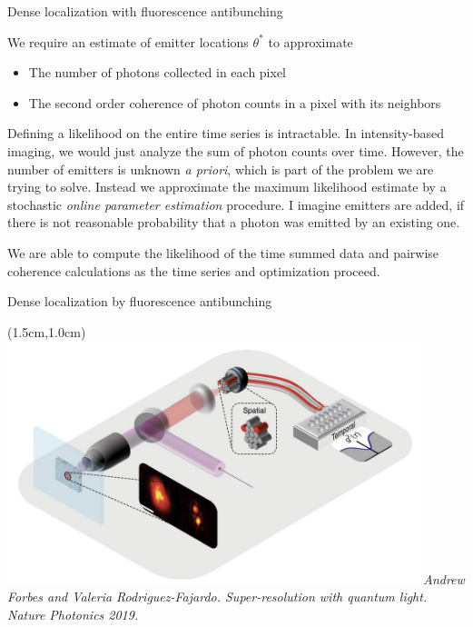 \documentclass{beamer}					%
\begin{document}
\begin{frame}{Dense localization with fluorescence antibunching}

We require an estimate of emitter locations $\theta^{*}$ to approximate 

\begin{itemize}
\item The number of photons collected in each pixel \\
\item The second order coherence of photon counts in a pixel with its neighbors 
\end{itemize}

Defining a likelihood on the entire time series is intractable. In intensity-based imaging, we would just analyze the sum of photon counts over time. However, the number of emitters is unknown \emph{a priori}, which is part of the problem we are trying to solve. Instead we approximate the maximum likelihood estimate by a stochastic \emph{online parameter estimation} procedure. I imagine emitters are added, if there is not reasonable probability that a photon was emitted by an existing one.

We are able to compute the likelihood of the time summed data and pairwise coherence calculations as the time series and optimization proceed.

\end{frame}

\begin{frame}{Dense localization by fluorescence antibunching}
\begin{textblock*}{12cm}(1.5cm,1.0cm)
\includegraphics[width=12cm]{Quantum.png}
\textit{Andrew Forbes and Valeria Rodriguez-Fajardo. Super-resolution with quantum light. Nature Photonics 2019.}
\end{textblock*}
\end{frame}
\end{document}
